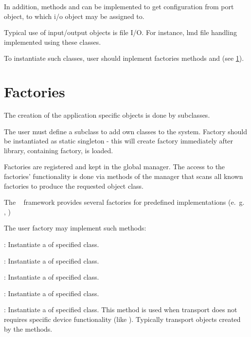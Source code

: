 In addition, methods  and
 can be implemented to get 
configuration from port object, to which i/o object may be assigned to.  

Typical use of input/output objects is file I/O. 
For instance, lmd file handling implemented
using these classes.

To instantiate such classes, user should inplement factories methods 
 and  (see \ref{prog_plugin_factory}).


\section{Factories}
\label{prog_plugin_factory}

The creation of the application specific objects is done by  subclasses.

The user must define a  
subclass to add own classes to the system.
Factory should be instantiated as static singleton - this will create factory  
immediately after library, containing factory, is loaded. 

Factories are registered and kept in the global manager. 
The access to the factories' functionality is done via methods of the
manager that scans all known factories to produce the requested object class. 

The \dabc~ framework provides several factories for predefined 
implementations (e.~g.~ , )


The user factory may implement such methods:
\bdes
	\item [\func{CreateModule()}] : 
	Instantiate a  of specified class. 
	
\item [\func{CreateDevice()}] : 
	Instantiate a  of specified class. 

\item [\func{CreateThread()}] : 
   Instantiate a  of specified class.
	
\item [\func{CreateApplication()}] : 
	Instantiate a  of specified class.

\item [\func{CreateTransport()}] : 
   Instantiate a  of specified class.
   This method is used when transport does not requires specific device functionality
   (like ). Typically transport objects
   created by the  methods.   
	
